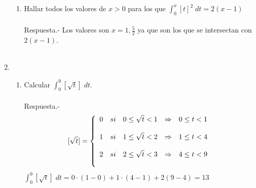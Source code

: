 \begin{enumerate}[ \bfseries 1.]
\begin{enumerate}[\bfseries (a)]
	\item Hallar todos los valores de $x>0$ para los que $\displaystyle\int_{0}^{x} [t]^2 \; dt=2(x-1)$\\\\
	    Respuesta.-\; Los valores son $x=1,\frac{5}{2}$ ya que son los que se intersectan con $2(x-1)$.\\\\ 

    \end{enumerate}

    \item 
	\begin{enumerate}[\bfseries (a)]
		
	    \item Calcular $\displaystyle\int_{0}^{9} [\sqrt{t}] \; dt$.\\\\
		Respuesta.-\;
		$$[\sqrt{t}] = \left\{ \begin{array}{c c l c r}
		    0 & si & 0\leq \sqrt{t}<1 & \Rightarrow & 0\leq t < 1\\
		    \\1 & si & 1 \leq \sqrt{t} < 2 & \Rightarrow & 1 \leq t < 4\\
		    \\2 & si & 2 \leq \sqrt{t}<3 & \Rightarrow & 4\leq t < 9\\\\
		\end{array}\right.$$
		    $\displaystyle\int_{0}^{9} \left[\sqrt{t}\right]\; dt = 0\cdot(1-0) + 1\cdot (4-1) + 2(9-4)=13$\\\\


\end{enumerate}
\end{enumerate}
